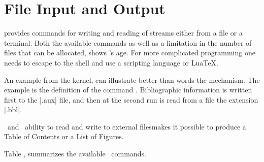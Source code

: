 
\chapter{File Input and Output}

\tex provides commands for writing and reading of streams
either from a file or a terminal. Both the available commands as well as a limitation in the number of files that can be allocated, shows \tex's age. For more complicated programming one needs to escape to the shell and use a scripting language or LuaTeX. 

An example from the \latexe kernel, can illustrate better than
words the mechanism. The example is the definition of
the command . Bibliographic information is written first to the |.aux| file, and then at the second run is read from a file the extension |.bbl|.


\tex\ and \latex\  ability to read and write to external filesmakes it possible to produce
a Table of Contents or a List of Figures. 


Table , summarizes the available \tex\ commands. 

